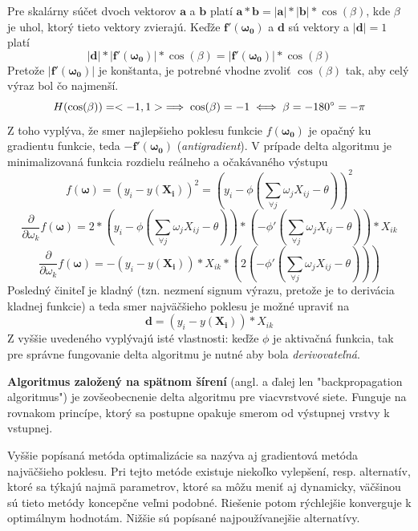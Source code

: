 Pre skalárny súčet dvoch vektorov $\pmb{a}$ a $\pmb{b}$ platí $\pmb{a} * \pmb{b} = |\pmb{a}| * |\pmb{b}| * \cos(\beta)$, kde $\beta$
je uhol, ktorý tieto vektory zvierajú.
Keďže $\pmb{f'}(\pmb{\omega_0})$ a $\pmb{d}$ sú vektory a $|\pmb{d}|=1$ platí
\begin{equation}
    |\pmb{d}| * |\pmb{f'}(\pmb{\omega_0})| * \cos(\beta) = |\pmb{f'}(\pmb{\omega_0})| * \cos(\beta)
\end{equation}
Pretože $|\pmb{f'}(\pmb{\omega_0})|$ je konštanta, je potrebné vhodne zvoliť $\cos(\beta)$ tak, aby celý výraz bol čo
najmenší.
\begin{equation}
    H(\cos(\beta)) = <-1,1> \implies \cos(\beta) = -1 \iff \beta = -180\degree = -\pi
\end{equation}
Z toho vyplýva, že smer najlepšieho poklesu funkcie $f(\pmb{\omega_0})$ je opačný ku gradientu funkcie, teda
$-\pmb{f'}(\pmb{\omega_0})$ (\emph{antigradient}).
V prípade delta algoritmu je minimalizovaná funkcia rozdielu reálneho a očakávaného výstupu
\begin{equation}
    f(\pmb{\omega})=(y_i-y(\mathbf{X_i}))^2=(y_i-\phi(\sum_{\forall j}{\omega_j X_{ij}-\theta}))^2
\end{equation}
\begin{equation}
    \frac{\partial}{\partial \omega_k}f(\pmb{\omega})=2*(y_i-\phi(\sum_{\forall j}{\omega_j X_{ij}-\theta}))*(-\phi'(\sum_{\forall j}{\omega_j X_{ij}-\theta}))*X_{ik}
\end{equation}
\begin{equation}
    \frac{\partial}{\partial \omega_k}f(\pmb{\omega})=-(y_i-y(\mathbf{X_i}))*X_{ik}*(2(-\phi'(\sum_{\forall j}{\omega_j X_{ij}-\theta})))
\end{equation}
Posledný činiteľ je kladný (tzn. nezmení signum výrazu, pretože je to derivácia kladnej funkcie) a teda smer
najväčšieho poklesu je možné upraviť na
\begin{equation}
    \pmb{d}=(y_i-y(\mathbf{X_i}))*X_{ik}
\end{equation}
Z vyššie uvedeného vyplývajú isté vlastnosti: keďže $\phi$ je aktivačná funkcia, tak pre správne fungovanie delta
algoritmu je nutné aby bola \emph{derivovateľná}.

\textbf{Algoritmus založený na spätnom šírení} (angl. a ďalej len "backpropagation algoritmus") je zovšeobecnenie delta
algoritmu pre viacvrstvové siete.
Funguje na rovnakom princípe, ktorý sa postupne opakuje smerom od výstupnej vrstvy k vstupnej.

Vyššie popísaná metóda optimalizácie sa nazýva aj gradientová metóda najväčšieho poklesu.
Pri tejto metóde existuje niekoľko vylepšení, resp. alternatív, ktoré sa týkajú najmä parametrov, ktoré sa môžu meniť
aj dynamicky, väčšinou sú tieto metódy koncepčne veľmi podobné.
Riešenie potom rýchlejšie konverguje k optimálnym hodnotám.
Nižšie sú popísané najpoužívanejšie alternatívy.
